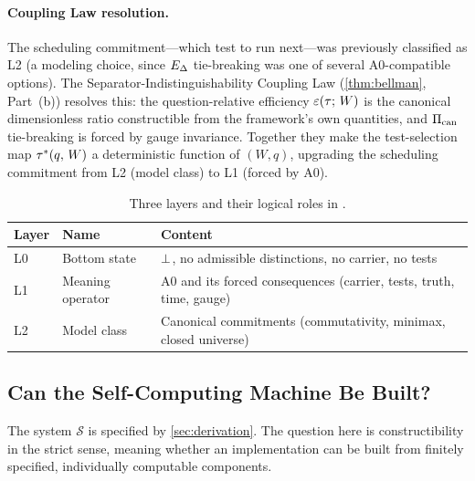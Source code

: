 \paragraph{Coupling Law resolution.}
The scheduling commitment---which test to run next---was previously
classified as L2 (a modeling choice, since $E_\Delta$ tie-breaking was
one of several A0-compatible options).  The Separator-Indistinguishability
Coupling Law (\cref{thm:bellman}, Part~(b)) resolves this: the
question-relative efficiency $\varepsilon(\tau;\, W)$ is the canonical dimensionless
ratio constructible from the framework's own quantities, and $\Pi_{\mathrm{can}}$
tie-breaking is forced by gauge invariance.  Together they make the
test-selection map $\tau^*(q,\, W)$ a deterministic function of $(W, q)$,
upgrading the scheduling commitment from L2 (model class) to L1 (forced
by A0).

\begin{table}[ht]
\centering
\small
\caption{Three layers and their logical roles in \Opoch.}
\begin{tabular}{@{}lll@{}}
\toprule
\textbf{Layer} & \textbf{Name} & \textbf{Content} \\
\midrule
L0 & Bottom state & $\bot$, no admissible distinctions, no carrier, no tests \\
L1 & Meaning operator & A0 and its forced consequences (carrier, tests, truth, time, gauge) \\
L2 & Model class & Canonical commitments (commutativity, minimax, closed universe) \\
\bottomrule
\end{tabular}
\end{table}

\subsection{Can the Self-Computing Machine Be Built?}
\label{app:oq:machine}

The system $\mathcal{S}$ is specified by \cref{sec:derivation}.  The question here is
constructibility in the strict sense, meaning whether an implementation can
be built from finitely specified, individually computable components.

